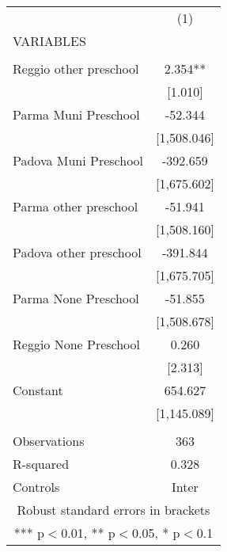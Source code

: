 \begin{tabular}{lc} \hline
 & (1) \\
VARIABLES &  \\ \hline
 &  \\
Reggio other preschool & 2.354** \\
 & [1.010] \\
Parma Muni Preschool & -52.344 \\
 & [1,508.046] \\
Padova Muni Preschool & -392.659 \\
 & [1,675.602] \\
Parma other preschool & -51.941 \\
 & [1,508.160] \\
Padova other preschool & -391.844 \\
 & [1,675.705] \\
Parma None Preschool & -51.855 \\
 & [1,508.678] \\
Reggio None Preschool & 0.260 \\
 & [2.313] \\
Constant & 654.627 \\
 & [1,145.089] \\
 &  \\
Observations & 363 \\
R-squared & 0.328 \\
 Controls & Inter \\ \hline
\multicolumn{2}{c}{ Robust standard errors in brackets} \\
\multicolumn{2}{c}{ *** p$<$0.01, ** p$<$0.05, * p$<$0.1} \\
\end{tabular}
